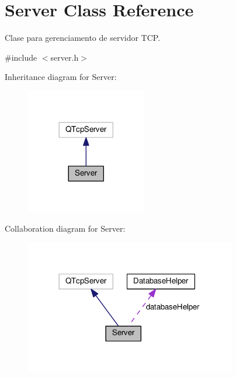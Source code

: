 \hypertarget{classServer}{}\section{Server Class Reference}
\label{classServer}


Clase para gerenciamento de servidor T\+CP.  




{\ttfamily \#include $<$server.\+h$>$}



Inheritance diagram for Server\+:\nopagebreak
\begin{figure}[H]
\begin{center}
\leavevmode
\includegraphics[width=149pt]{d3/dd7/classServer__inherit__graph}
\end{center}
\end{figure}


Collaboration diagram for Server\+:\nopagebreak
\begin{figure}[H]
\begin{center}
\leavevmode
\includegraphics[width=261pt]{de/ddc/classServer__coll__graph}
\end{center}
\end{figure}
